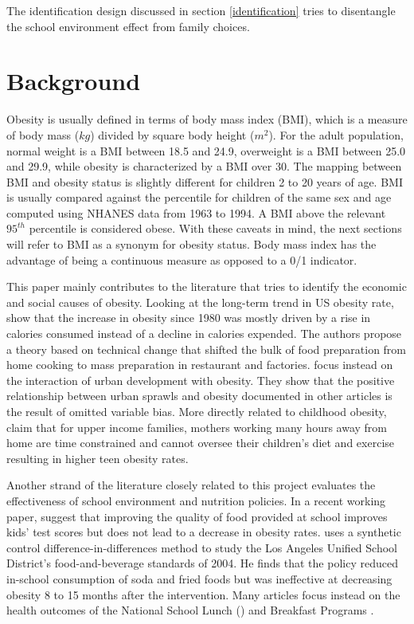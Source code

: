 \documentclass[twoside,12pt]{article}
\begin{document}
The identification design discussed in section \ref{identification} tries to disentangle the school environment effect from family choices.

\section{Background}
\label{backgr}
Obesity is usually defined in terms of body mass index (BMI), which is a measure of body mass ($kg$) divided by square body height ($m^2$). For the adult population, normal weight is a BMI between 18.5 and 24.9, overweight is a BMI between 25.0 and 29.9, while obesity is characterized by a BMI over 30. The mapping between BMI and obesity status is slightly different for children 2 to 20 years of age. BMI is usually compared against the percentile for children of the same sex and age computed using NHANES data from 1963 to 1994. A BMI above the relevant $95^{th}$ percentile is considered obese. With these caveats in mind, the next sections will refer to BMI as a synonym for obesity status. Body mass index has the advantage of being a continuous measure as opposed to a 0/1 indicator.

This paper mainly contributes to the literature that tries to identify the economic and social causes of obesity. Looking at the long-term trend in US obesity rate, \cite{cutler2002have} show that the increase in obesity since 1980 was mostly driven by a rise in calories consumed instead of a decline in calories expended. The authors propose a theory based on technical change that shifted the bulk of food preparation from home cooking to mass preparation in restaurant and factories. \cite{eid2008fat} focus instead on the interaction of urban development with obesity. They show that the positive relationship between urban sprawls and obesity documented in other articles is the result of omitted variable bias. More directly related to childhood obesity, \cite{anderson2003economic} claim that for upper income families, mothers working many hours away from home are time constrained and cannot oversee their children's diet and exercise resulting in higher teen obesity rates. 

Another strand of the literature closely related to this project evaluates the effectiveness of school environment and nutrition policies. In a recent working paper, \cite{anderson2017school} suggest that improving the quality of food provided at school improves kids' test scores but does not lead to a decrease in obesity rates. \cite{bauhoff2014effect} uses a synthetic control difference-in-differences method to study the Los Angeles Unified School District's food-and-beverage standards of 2004. He finds that the policy reduced in-school consumption of soda and fried foods but was ineffective at decreasing obesity 8 to 15 months after the intervention. Many articles focus instead on the health outcomes of the National School Lunch (\citealp{gundersen2012impact, campbell2011does}) and Breakfast Programs \citep{bhattacharya2006breakfast}.
\end{document}
